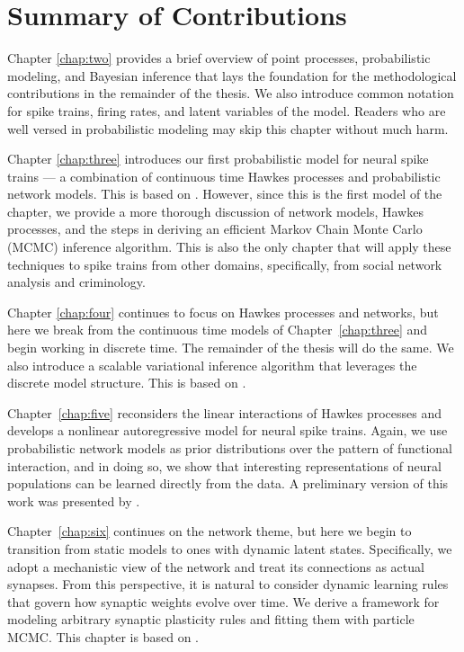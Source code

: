 \section{Summary of Contributions}

Chapter \ref{chap:two} provides a brief overview of point processes, 
probabilistic modeling, and Bayesian inference that lays the foundation for the 
methodological contributions in the remainder of the thesis. We also introduce 
common notation for spike trains, firing rates, and latent variables of the model. 
Readers who are well versed in probabilistic modeling may skip this chapter without 
much harm. 

Chapter \ref{chap:three} introduces our first probabilistic model for neural 
spike trains --- a combination of continuous time Hawkes processes and probabilistic network 
models. This is based on \citet{linderman2014discovering}. However, since this 
is the first model of the chapter, we provide a 
more thorough discussion of network models, Hawkes processes, and the steps 
in deriving an efficient Markov Chain Monte Carlo (MCMC) inference algorithm.
This is also the only chapter that will apply these techniques to spike trains 
from other domains, specifically, from social network analysis and criminology.

Chapter \ref{chap:four} continues to focus on Hawkes processes and networks, 
but here we break from the continuous time models of Chapter~\ref{chap:three} and 
begin working in discrete time. The remainder of the thesis will do the same. 
We also introduce a scalable variational inference algorithm that leverages 
the discrete model structure. This is based on \citet{linderman2015scalable}. 

Chapter~\ref{chap:five} reconsiders the linear interactions of Hawkes processes 
and develops a nonlinear autoregressive model for neural spike trains. Again, 
we use probabilistic network models as prior distributions over the pattern of 
functional interaction, and in doing so, we show that interesting representations 
of neural populations can be learned directly from the data. A preliminary version 
of this work was presented by \citet{linderman2015cosyne}.

Chapter~\ref{chap:six} continues on the network theme, but here we begin to 
transition from static models to ones with dynamic latent states. Specifically, 
we adopt a mechanistic view of the network and treat its connections as actual
synapses. From this perspective, it is natural to consider dynamic learning rules 
that govern how synaptic weights evolve over time. We derive a framework for 
modeling arbitrary synaptic plasticity rules and fitting them with particle MCMC.
This chapter is based on \citet{linderman2014framework}.

